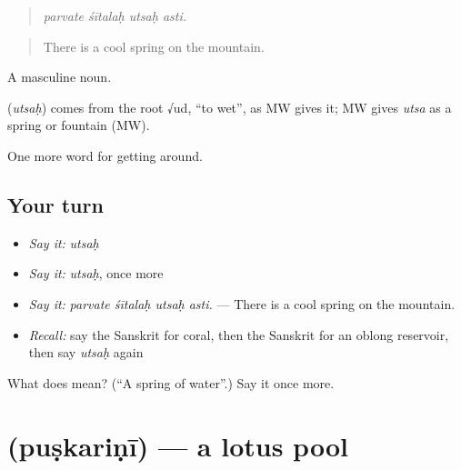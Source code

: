 \begin{quote}
   
\end{quote}

\begin{quote}
\emph{parvate śītalaḥ utsaḥ asti.}
\end{quote}

\begin{quote}
There is a cool spring on the mountain.
\end{quote}

A masculine noun.

\begin{cousinweb}
\textbf{} (\emph{utsaḥ}) comes from the root √ud, \textquotedblleft{}to wet\textquotedblright{}, as MW gives it; MW gives \emph{utsa} as a spring or fountain (MW).
\end{cousinweb}

\begin{grammarlens}[title={What you've built}]
One more word for getting around.
\end{grammarlens}

\subsection*{Your turn}
\begin{itemize}
\raggedright
  \item \emph{Say it:} \emph{utsaḥ}
  \item \emph{Say it:} \emph{utsaḥ}, once more
  \item \emph{Say it:} \emph{parvate śītalaḥ utsaḥ asti.} — There is a cool spring on the mountain.
  \item \emph{Recall:} say the Sanskrit for coral, then the Sanskrit for an oblong reservoir, then say \emph{utsaḥ} again
\end{itemize}

\begin{tcolorbox}[breakable,colback=teal!4,colframe=teal!35!black,title={Before you move on}]
What does  mean? (\textquotedblleft{}A spring of water\textquotedblright{}.) Say it once more.
\end{tcolorbox}
\section[\texorpdfstring{\sk{पुष्करिणी} (puṣkariṇī)}{पुष्करिणी (puṣkariṇī)}]{ (puṣkariṇī) — a lotus pool}

\label{lesson:SA-C419-puskarini}



